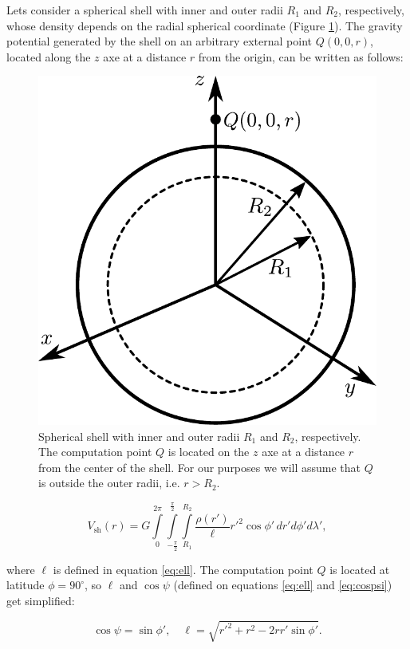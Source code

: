 \documentclass[extra]{gji}
\begin{document}
Lets consider a spherical shell with inner and outer radii $R_1$ and
$R_2$, respectively, whose density depends on the radial spherical
coordinate (Figure \ref{fig:spherical-shell}).
The gravity potential generated by the shell on an arbitrary external
point $Q(0,0,r)$, located along the $z$ axe at a distance $r$ from the
origin, can be written as follows:

\begin{figure}
\centering
\includegraphics[width=0.7\linewidth]{figures/spherical-shell.pdf}
\caption{
    Spherical shell with inner and outer radii $R_1$ and $R_2$, respectively.
    The computation point $Q$ is located on the $z$ axe at a distance $r$ from
    the center of the shell.
    For our purposes we will assume that $Q$ is outside the outer radii,
    i.e. $r > R_2$.
    }
\label{fig:spherical-shell}
\end{figure}

\begin{equation}
    V_\text{sh}(r) = G
    \int\limits_0^{2\pi}
    \int\limits_{-\frac{\pi}{2}}^\frac{\pi}{2}
    \int\limits_{R_1}^{R_2}
    \frac{\rho(r')}{\ell} {r'}^2 \cos\phi' \,
    dr' d\phi' d\lambda',
\end{equation}

\noindent where $\ell$ is defined in equation \ref{eq:ell}. The computation
point $Q$ is located at latitude $\phi=90^\circ$, so $\ell$ and $\cos\psi$
(defined on equations \ref{eq:ell} and \ref{eq:cospsi}) get simplified:

\begin{equation}
    \cos\psi = \sin\phi', \quad
    \ell = \sqrt{r'^2 + r^2 - 2 r r' \sin\phi'}.
\end{equation}
\end{document}

